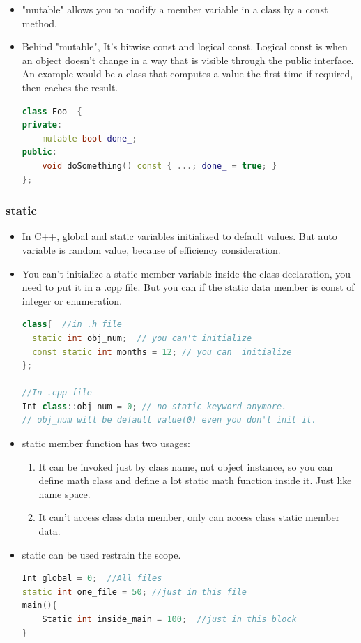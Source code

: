 \documentclass[a4paper,12pt,twoside]{book}
\begin{document}
\begin{itemize}
\item "mutable" allows you to modify a member variable in a class by a const method.

\item Behind "mutable", It's bitwise const and logical const. Logical const is when an object doesn't change in a way that is visible through the public interface. An example would be a class that computes a value the first time if required, then caches the result.
\begin{lstlisting}[frame=single, language=c++]
class Foo  {
private:
    mutable bool done_;
public:
    void doSomething() const { ...; done_ = true; }
};
\end{lstlisting}

\end{itemize}

\subsubsection{static}
\begin{itemize}
\item In C++, global and static variables initialized to default values.  But auto variable is random value, because of efficiency consideration.

\item You can't initialize a static member variable inside the class declaration, you need to put it in a .cpp file.   But you can if the static data member is const of integer or enumeration.
\begin{lstlisting}[frame=single, language=c++]
class{  //in .h file
  static int obj_num;  // you can't initialize
  const static int months = 12; // you can  initialize
};

//In .cpp file
Int class::obj_num = 0; // no static keyword anymore.
// obj_num will be default value(0) even you don't init it.
\end{lstlisting}

\item static member function has two usages:
\begin{enumerate}
\item It can be invoked just by class name, not object instance, so you can define math class and define a lot static math function inside it.  Just like name space.
\item It can't access class data member, only can access class static member data.
\end{enumerate}

\item static can be used restrain the scope.
\begin{lstlisting}[frame=single, language=c++]
Int global = 0;  //All files
static int one_file = 50; //just in this file
main(){
    Static int inside_main = 100;  //just in this block
}
\end{lstlisting}

\end{itemize}
\end{document}
